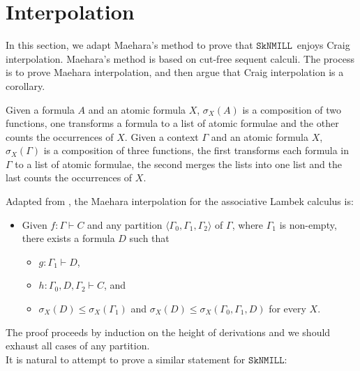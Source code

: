 \documentclass[sn-mathphys-num]{sn-jnl}%
\newcommand{\GG}{\Gamma}
\newcommand{\SkNMILL}{$\mathtt{SkNMILL}$}
\newcommand{\gs}[1]{\sigma_{X} (#1)}
\theoremstyle{thmstyleone}%
\theoremstyle{thmstyletwo}%
\theoremstyle{thmstylethree}%
\begin{document}
\section{Interpolation}\label{sec:interpolation}
In this section, we adapt Maehara's method to prove that \SkNMILL~enjoys Craig interpolation.
Maehara's method is based on cut-free sequent calculi.
The process is to prove Maehara interpolation, and then argue that Craig interpolation is a corollary.

Given a formula $A$ and an atomic formula $X$, $\gs{A}$ is a composition of two functions, one transforms a formula to a list of atomic formulae and the other counts the occurrences of $X$.
Given a context $\GG$ and an atomic formula $X$, $\gs{\GG}$ is a composition of three functions, the first transforms each formula in $\GG$ to a list of atomic formulae, the second merges the lists into one list and the last counts the occurrences of $X$.

Adapted from \cite[Chapter 2.10]{moot:categorial:2012}, the Maehara interpolation for the associative Lambek calculus is:
\begin{itemize}
  \item[\ ] Given $f : \Gamma \vdash C$ and any partition $\langle \Gamma_0, \Gamma_1, \Gamma_2 \rangle$ of $\Gamma$, where $\GG_1$ is non-empty, there exists a formula $D$ such that
  \begin{itemize}
    \item[--] $g : \Gamma_1 \vdash D$,
    \item[--] $h : \Gamma_0, D, \Gamma_2 \vdash C$, and 
    \item[--] $\gs{D} \leq \gs{\GG_1}$ and  $\gs{D} \leq \gs{\GG_0 , \GG_1 , D}$ for every $X$.
  \end{itemize}
\end{itemize}
The proof proceeds by induction on the height of derivations and we should exhaust all cases of any partition.
\\
It is natural to attempt to prove a similar statement for \SkNMILL:
\end{document}

